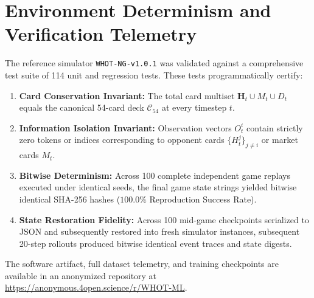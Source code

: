 \documentclass[journal]{IEEEtran}
\begin{document}
\section{Environment Determinism and Verification Telemetry}
\label{sec:supp_determinism}

The reference simulator \texttt{WHOT-NG-v1.0.1} was validated against a comprehensive test suite of 114 unit and regression tests. These tests programmatically certify:
\begin{enumerate}
\item \textbf{Card Conservation Invariant:} The total card multiset $\mathbf{H}_t \cup M_t \cup D_t$ equals the canonical 54-card deck $\mathcal{C}_{54}$ at every timestep $t$.
\item \textbf{Information Isolation Invariant:} Observation vectors $O_t^i$ contain strictly zero tokens or indices corresponding to opponent cards $\{H_t^j\}_{j \ne i}$ or market cards $M_t$.
\item \textbf{Bitwise Determinism:} Across 100 complete independent game replays executed under identical seeds, the final game state strings yielded bitwise identical SHA-256 hashes ($100.0\%$ Reproduction Success Rate).
\item \textbf{State Restoration Fidelity:} Across 100 mid-game checkpoints serialized to JSON and subsequently restored into fresh simulator instances, subsequent 20-step rollouts produced bitwise identical event traces and state digests.
\end{enumerate}

The software artifact, full dataset telemetry, and training checkpoints are available in an anonymized repository at \url{https://anonymous.4open.science/r/WHOT-ML}.



\end{document}
